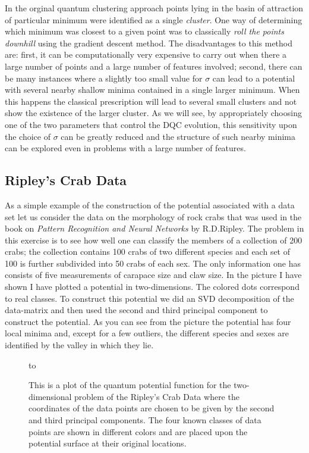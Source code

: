 \documentclass[fleqn,twoside]{article}
\begin{document}
In the orginal quantum clustering approach\cite{qc1} points lying in
the basin of attraction of particular minimum were identified as a
single {\it cluster}. One way of determining which minimum was
closest to a given point was to classically {\it roll the points
downhill\/} using the gradient descent method.  The disadvantages to
this method are: first, it can be computationally very expensive to
carry out when there a large number of points and a large number of
features involved; second, there can be many instances where a slightly
too small value for $\sigma$ can lead to a potential with several
nearby shallow minima contained in a single larger minimum. When this
happens the classical prescription will lead to several small
clusters and not show the existence of the larger cluster.  As we
will see, by appropriately choosing one of the two parameters that
control the DQC evolution, this sensitivity upon the choice of
$\sigma$ can be greatly reduced and the structure of such nearby
minima can be explored even in problems with a large number
of features.

\subsection{Ripley's Crab Data}

As a simple example of the construction of the potential associated
with a data set let us consider the data on the morphology of rock
crabs that was used in the book on {\it Pattern Recognition and Neural
Networks\/} by R.D.Ripley\cite{Ripley}.  The problem in this
exercise is to see how well one can classify the members of a
collection of 200 crabs; the collection contains 100 crabs of
two different species and each set of 100 is further subdivided
into 50 crabs of each sex.  The only information one has consists
of five measurements of carapace size and claw size.  In the picture
I have shown I have plotted a potential in two-dimensions.  The
colored dots correspond to real classes.  To construct this
potential we did an SVD decomposition of the data-matrix and then
used the second and third principal component to construct the
potential.  As you can see from the picture the potential has
four local minima and, except for a few outliers, the different
species and sexes are identified by the valley in which they lie.

\begin{figure}[h!]
 \hbox to 
  \caption{This is a plot of the quantum potential function for
  the two-dimensional problem of the Ripley's Crab Data where
  the coordinates of the data points are chosen to be given by
  the second and third principal components.  The four known
  classes of data points are shown in different colors and
  are placed upon the potential surface at their original locations.
  }
\label{twodpot}
\end{figure}
\end{document}
